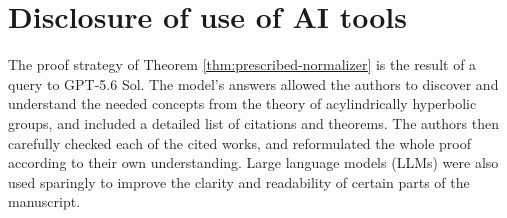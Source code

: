 \documentclass[10pt,a4paper]{amsart}
\begin{document}
\section*{Disclosure of use of AI tools}

The proof strategy of Theorem \ref{thm:prescribed-normalizer} is the result of a query to GPT-5.6 Sol. The model's answers allowed the authors to discover and understand the needed concepts from the theory of acylindrically hyperbolic groups, and included a detailed list of citations and theorems. The authors then carefully checked each of the cited works, and reformulated the whole proof according to their own understanding. Large language models (LLMs) were also used sparingly to improve the clarity and readability of certain parts of the manuscript.



\end{document}
